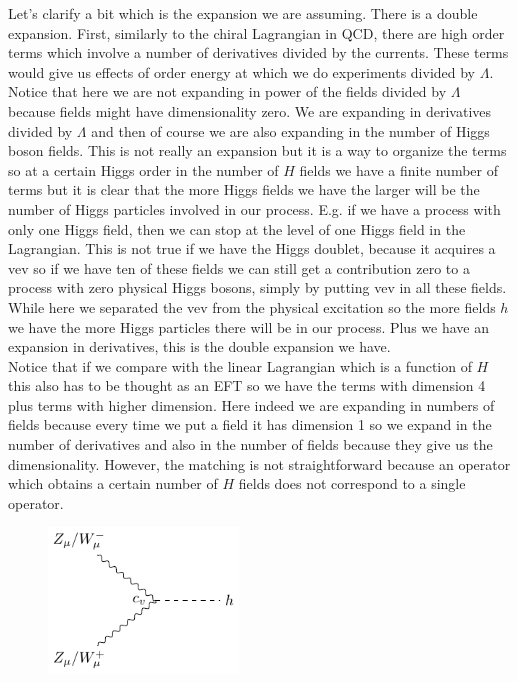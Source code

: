 \documentclass[../main.tex]{subfiles}
\begin{document}
Let's clarify a bit which is the expansion we are assuming. There is a double expansion. First, similarly to the chiral Lagrangian in QCD, there are high order terms which involve a number of derivatives divided by the currents. These terms would give us effects of order energy at which we do experiments divided by $\Lambda$. Notice that here we are not expanding in power of the fields divided by $\Lambda$ because fields might have dimensionality zero. We are expanding in derivatives divided by $\Lambda$ and then of course we are also expanding in the number of Higgs boson fields. This is not really an expansion but it is a way to organize the terms so at a certain Higgs order in the number of $H$ fields we have a finite number of terms but it is clear that the more Higgs fields we have the larger will be the number of Higgs particles involved in our process. E.g. if we have a process with only one Higgs field, then we can stop at the level of one Higgs field in the Lagrangian. This is not true if we have the Higgs doublet, because it acquires a vev so if we have ten of these fields we can still get a contribution zero to a process with zero physical Higgs bosons, simply by putting vev in all these fields. While here we separated the vev from the physical excitation so the more fields $h$ we have the more Higgs particles there will be in our process. Plus we have an expansion in derivatives, this is the double expansion we have.\\
Notice that if we compare with the linear Lagrangian which is a function of $H$ this also has to be thought as an EFT so we have the terms with dimension 4 plus terms with higher dimension. Here indeed we are expanding in numbers of fields because every time we put a field it has dimension 1 so we expand in the number of derivatives and also in the number of fields because they give us the dimensionality. However, the matching is not straightforward because an operator which obtains a certain number of $H$ fields does not correspond to a single operator.
\begin{figure}[h]
    \centering
    \includegraphics[width=0.45\textwidth]{Images/zwcv.pdf}
    \caption*{}
\end{figure}\\
\end{document}

